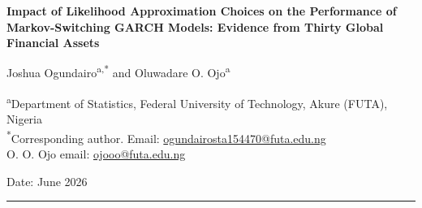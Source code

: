 \documentclass[12pt, a4paper]{article}
\begin{document}
\begin{center}
{\LARGE \bfseries Impact of Likelihood Approximation Choices on the Performance of Markov-Switching GARCH Models: Evidence from Thirty Global Financial Assets}

\vspace{1.2em}

{\large
Joshua Ogundairo\textsuperscript{a,*} \quad and \quad Oluwadare O. Ojo\textsuperscript{a}
}

\vspace{0.6em}

{\small
\textsuperscript{a}Department of Statistics, Federal University of Technology, Akure (FUTA), Nigeria\\[2pt]
\textsuperscript{*}Corresponding author. Email: \href{mailto:ogundairosta154470@futa.edu.ng}{ogundairosta154470@futa.edu.ng}\\
O. O. Ojo email: \href{mailto:ojooo@futa.edu.ng}{ojooo@futa.edu.ng}
}

\vspace{1em}
{\small Date: June 2026}
\end{center}

\vspace{1em}
\hrule
\vspace{0.5em}
\end{document}
